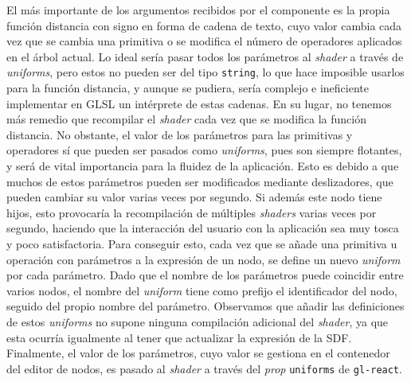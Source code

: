 El  más importante de los argumentos recibidos por el componente es la propia función distancia con signo en forma de cadena de texto, cuyo valor cambia cada vez que se cambia una primitiva o se modifica el número de operadores aplicados en el árbol actual. Lo ideal sería pasar todos los parámetros al \textit{shader} a través de \textit{uniforms}, pero estos no pueden ser del tipo \texttt{string}, lo que hace imposible usarlos para la función distancia, y aunque se pudiera, sería complejo e ineficiente implementar en GLSL un intérprete de estas cadenas. En su lugar, no tenemos más remedio que recompilar el \textit{shader} cada vez que se modifica la función distancia. No obstante, el valor de los parámetros para las primitivas y operadores sí que pueden ser pasados como \textit{uniforms}, pues son siempre flotantes, y será de vital importancia para la fluidez de la aplicación. Esto es debido a que muchos de estos parámetros pueden ser modificados mediante deslizadores, que pueden cambiar su valor varias veces por segundo. Si además este nodo tiene hijos, esto provocaría la recompilación de múltiples \textit{shaders} varias veces por segundo, haciendo que la interacción del usuario con la aplicación sea muy tosca y poco satisfactoria. Para conseguir esto, cada vez que se añade una primitiva u operación con parámetros a la expresión de un nodo, se define un nuevo \textit{uniform} por cada parámetro. Dado que el nombre de los parámetros puede coincidir entre varios nodos, el nombre del \textit{uniform} tiene como prefijo el identificador del nodo, seguido del propio nombre del parámetro. Observamos que añadir las definiciones de estos \textit{uniforms} no supone ninguna compilación adicional del \textit{shader}, ya que esta ocurría igualmente al tener que actualizar la expresión de la SDF. Finalmente, el valor de los parámetros, cuyo valor se gestiona en el contenedor del editor de nodos, es pasado al \textit{shader} a través del \textit{prop} \texttt{uniforms} de \texttt{gl-react}.\newline

